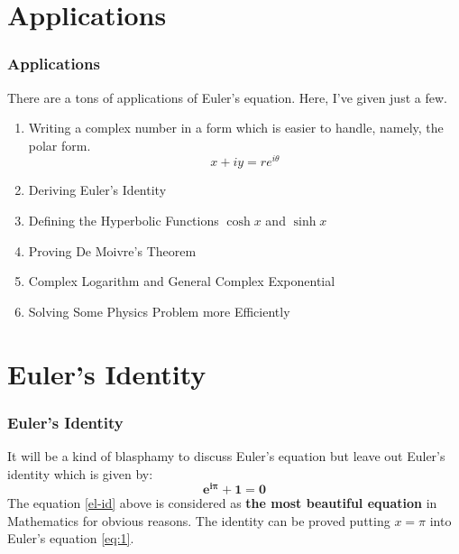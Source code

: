 \documentclass{beamer}
\begin{document}
\section{Applications}
\begin{frame}
    \frametitle{Applications}
     There are a tons of applications of Euler's equation. Here, I've given just a few.
    \begin{enumerate}
        \color{blue}
        \item <2-> Writing a complex number in a form which is easier to handle, namely, the polar form. $$x+iy = re^{i\theta}$$
        \item <3-> Deriving Euler's Identity
        \item <4-> Defining the Hyperbolic Functions $\cosh{x}$ and $\sinh{x}$
        \item <5-> Proving De Moivre’s Theorem
        \item <6-> Complex Logarithm and General Complex Exponential
        \item <7-> Solving Some Physics Problem more Efficiently
    \end{enumerate}
\end{frame}

\section{Euler's Identity}
\begin{frame}
    \frametitle{Euler's Identity}
    \color{ginger}
    It will be a kind of blasphamy to discuss Euler's equation but leave out Euler's identity which is given by:
    \begin{equation}
        \label{el-id}
        \mathbf{e^{i\pi} + 1 = 0}
    \end{equation}
    The equation \ref{el-id} above is considered as \textbf{the most beautiful equation} in Mathematics for obvious reasons. The identity can be proved putting $x=\pi$ into Euler's equation \ref{eq:1}.
\end{frame}
\end{document}
